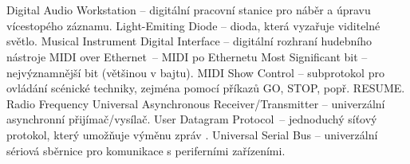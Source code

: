 \cleardoublepage
\chapter*{\listofabbrevname}
{}

\begin{acronym}[KolikMista]
    {Digital Audio Workstation -- digitální pracovní stanice pro náběr a úpravu vícestopého záznamu.}
    {Light-Emiting Diode -- dioda, která vyzařuje viditelné světlo.}
    {Musical Instrument Digital Interface -- digitální rozhraní hudebního nástroje}
    {\acs{MIDI} over Ethernet~-- \acs{MIDI} po Ethernetu}
    {Most Significant bit -- nejvýznamnější bit (většinou v bajtu).}
    {\acs{MIDI} Show Control -- subprotokol pro ovládání scénické techniky, zejména pomocí příkazů GO, STOP, popř. RESUME. \cite{MIDIspecs}}
    {Radio Frequency}
    {Universal Asynchronous Receiver/Transmitter -- univerzální asynchronní přijímač/vysílač.}
    {User Datagram Protocol~-- jednoduchý síťový protokol, který umožňuje výměnu zpráv  \cite{UDPpaper}.}
    {Universal Serial Bus -- univerzální sériová sběrnice pro komunikace s periferními zařízeními.}







%
%

\end{acronym}
